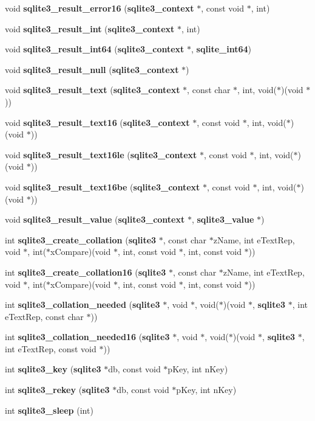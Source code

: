 \begin{DoxyCompactItemize}
\item 
void {\bf sqlite3\_\-result\_\-error16} ({\bf sqlite3\_\-context} $\ast$, const void $\ast$, int)
\item 
void {\bf sqlite3\_\-result\_\-int} ({\bf sqlite3\_\-context} $\ast$, int)
\item 
void {\bf sqlite3\_\-result\_\-int64} ({\bf sqlite3\_\-context} $\ast$, {\bf sqlite\_\-int64})
\item 
void {\bf sqlite3\_\-result\_\-null} ({\bf sqlite3\_\-context} $\ast$)
\item 
void {\bf sqlite3\_\-result\_\-text} ({\bf sqlite3\_\-context} $\ast$, const char $\ast$, int, void($\ast$)(void $\ast$))
\item 
void {\bf sqlite3\_\-result\_\-text16} ({\bf sqlite3\_\-context} $\ast$, const void $\ast$, int, void($\ast$)(void $\ast$))
\item 
void {\bf sqlite3\_\-result\_\-text16le} ({\bf sqlite3\_\-context} $\ast$, const void $\ast$, int, void($\ast$)(void $\ast$))
\item 
void {\bf sqlite3\_\-result\_\-text16be} ({\bf sqlite3\_\-context} $\ast$, const void $\ast$, int, void($\ast$)(void $\ast$))
\item 
void {\bf sqlite3\_\-result\_\-value} ({\bf sqlite3\_\-context} $\ast$, {\bf sqlite3\_\-value} $\ast$)
\item 
int {\bf sqlite3\_\-create\_\-collation} ({\bf sqlite3} $\ast$, const char $\ast$zName, int eTextRep, void $\ast$, int($\ast$xCompare)(void $\ast$, int, const void $\ast$, int, const void $\ast$))
\item 
int {\bf sqlite3\_\-create\_\-collation16} ({\bf sqlite3} $\ast$, const char $\ast$zName, int eTextRep, void $\ast$, int($\ast$xCompare)(void $\ast$, int, const void $\ast$, int, const void $\ast$))
\item 
int {\bf sqlite3\_\-collation\_\-needed} ({\bf sqlite3} $\ast$, void $\ast$, void($\ast$)(void $\ast$, {\bf sqlite3} $\ast$, int eTextRep, const char $\ast$))
\item 
int {\bf sqlite3\_\-collation\_\-needed16} ({\bf sqlite3} $\ast$, void $\ast$, void($\ast$)(void $\ast$, {\bf sqlite3} $\ast$, int eTextRep, const void $\ast$))
\item 
int {\bf sqlite3\_\-key} ({\bf sqlite3} $\ast$db, const void $\ast$pKey, int nKey)
\item 
int {\bf sqlite3\_\-rekey} ({\bf sqlite3} $\ast$db, const void $\ast$pKey, int nKey)
\item 
int {\bf sqlite3\_\-sleep} (int)

\end{DoxyCompactItemize}
